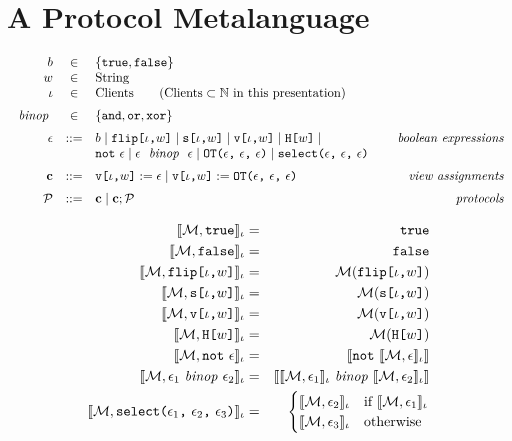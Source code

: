 \section{A Protocol Metalanguage}

$$
\begin{array}{rcl@{\hspace{8mm}}r}
b &\in& \{ \etrue, \efalse \} \\
w &\in& \mathrm{String} \\ 
\cid &\in& \mathrm{Clients} \qquad  (\mathrm{Clients} \subset \mathbb{N} \text{\ in\ this\ presentation})\\[2mm]
\bop &\in& \{ \eand, \eor, \exor \} \\[2mm]
\be &::=& b \mid \flip{\cid}{w} \mid \secret{\cid}{w} \mid \view{\cid}{w} \mid \oracle{w} \mid & \textit{boolean expressions}\\
& &  \enot\ \be \mid \be\ \bop\ \be \mid \OT{\be}{\be}{\be} \mid \select{\be}{\be}{\be} \\[2mm]
\instr &::=& \eassign{\view{\cid}{w}}{\be} \mid \eassign{\view{\cid}{w}}{\OT{\be}{\be}{\be}} & \textit{view assignments} \\[2mm]
\prog &::=& \instr \mid \instr; \prog & \textit{protocols}
\end{array}
$$

\begin{eqnarray*}
\lcod{\store, \etrue}{\cid} &=& \etrue\\
\lcod{\store, \efalse}{\cid} &=& \efalse\\
\lcod{\store, \flip{\cid}{w}}{\cid} &=& \store(\flip{\cid}{w})\\
\lcod{\store, \secret{\cid}{w}}{\cid} &=& \store(\secret{\cid}{w})\\
\lcod{\store, \view{\cid}{w}}{\cid} &=& \store(\view{\cid}{w})\\
\lcod{\store, \oracle{w}}{\cid} &=& \store(\oracle{w})\\
\lcod{\store, \enot\ \be}{\cid} &=& \cod{\enot\ \lcod{\store,\be}{\cid}}\\
\lcod{\store, \be_1\ \mathit{binop}\ \be_2}{\cid} &=&
    \cod{\lcod{\store,\be_1}{\cid}\ \mathit{binop}\ \lcod{\store,\be_2}{\cid}}\\
\lcod{\store, \select{\be_1}{\be_2}{\be_3}}{\cid} &=&
             \begin{cases}
                \lcod{\store,\be_2}{\cid} & \text{if\ } \lcod{\store,\be_1}{\cid}\\
                \lcod{\store,\be_3}{\cid} & \text{otherwise}
             \end{cases}
\end{eqnarray*}

